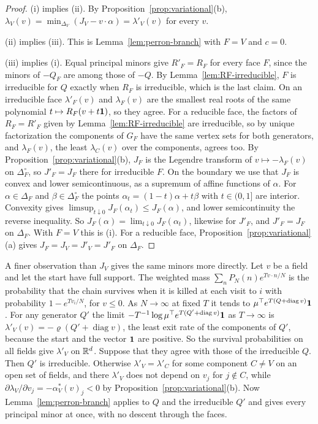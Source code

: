 \begin{proof}
(i) implies (ii). By Proposition~\ref{prop:variational}(b),
$\lambda_V(v)=\min_{\Delta_V}(J_V-v\cdot\alpha)=\lambda'_V(v)$ for every $v$.

(ii) implies (iii). This is Lemma~\ref{lem:perron-branch} with $F=V$ and $c=0$.

(iii) implies (i). Equal principal minors give $R'_F=R_F$ for every face $F$, since the
minors of $-Q_F$ are among those of $-Q$. By Lemma~\ref{lem:RF-irreducible}, $F$ is
irreducible for $Q$ exactly when $R_F$ is irreducible, which is the last claim. On an
irreducible face $\lambda'_F(v)$ and $\lambda_F(v)$ are the smallest real roots of the same
polynomial $t\mapsto R_F(v+t\mathbf{1})$, so they agree. For a reducible face, the factors of
$R_F=R'_F$ given by Lemma~\ref{lem:RF-irreducible} are irreducible, so by unique
factorization the components of $G_F$ have the same vertex sets for both generators, and
$\lambda_F(v)$, the least $\lambda_C(v)$ over the components, agrees too. By Proposition~\ref{prop:variational}(b), $J_F$ is the Legendre transform of
$v\mapsto-\lambda_F(v)$ on $\Delta_F^\circ$, so $J'_F=J_F$ there for irreducible $F$. On the
boundary we use that $J_F$ is convex and lower semicontinuous, as a supremum of affine
functions of $\alpha$. For $\alpha\in\Delta_F$ and $\beta\in\Delta_F^\circ$ the points
$\alpha_t=(1-t)\alpha+t\beta$ with $t\in(0,1]$ are interior. Convexity gives
$\limsup_{t\downarrow0}J_F(\alpha_t)\le J_F(\alpha)$, and lower semicontinuity the reverse
inequality. So $J_F(\alpha)=\lim_{t\downarrow0}J_F(\alpha_t)$, likewise for $J'_F$, and
$J'_F=J_F$ on $\Delta_F$. With $F=V$ this is (i). For a reducible face,
Proposition~\ref{prop:variational}(a) gives $J_F=J_V=J'_V=J'_F$ on $\Delta_F$.
\end{proof}

\begin{remark}\label{rem:survival}
A finer observation than $J_V$ gives the same minors more directly. Let $v$ be a field
and let the start have full support. The weighted mass
$\sum_nP_N(n)e^{Tv\cdot n/N}$ is the probability that the chain survives when it is
killed at each visit to $i$ with probability $1-e^{Tv_i/N}$, for $v\le0$. As $N\to\infty$ at
fixed $T$ it tends to $\mu^\top e^{T(Q+\operatorname{diag}v)}\mathbf{1}$. For any generator $Q'$
the limit $-T^{-1}\log\mu^\top e^{T(Q'+\operatorname{diag}v)}\mathbf{1}$ as $T\to\infty$ is
$\lambda'_V(v)=-\varrho(Q'+\operatorname{diag}v)$, the least exit rate of the components of
$Q'$, because the start and the vector $\mathbf{1}$ are positive. So the survival probabilities
on all fields give $\lambda'_V$ on $\mathbb{R}^d$. Suppose that they agree with those of the
irreducible $Q$. Then $Q'$ is irreducible. Otherwise $\lambda'_V=\lambda'_C$ for some
component $C\ne V$ on an open set of fields, and there $\lambda'_V$ does not depend on
$v_j$ for $j\notin C$, while $\partial\lambda_V/\partial v_j=-\alpha^*_V(v)_j<0$ by
Proposition~\ref{prop:variational}(b). Now Lemma~\ref{lem:perron-branch} applies to $Q$
and the irreducible $Q'$ and gives every principal minor at once, with no descent through
the faces.
\end{remark}

